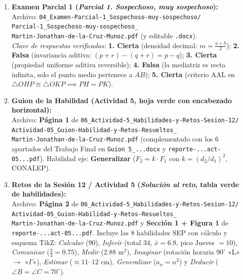 \documentclass[spanish,letterpaper,oneside]{article}
\begin{document}
\begin{enumerate}[leftmargin=1.5em,itemsep=4pt]
  \item \textbf{Examen Parcial 1 (\textit{Parcial 1. Sospechoso, muy sospechoso}):}\\
  Archivo: \texttt{04\_Examen-Parcial-1\_Sospechoso-muy-sospechoso/}\\
  \hspace*{1.2em}\texttt{Parcial-1\_Sospechoso-muy-sospechoso\_}\\
  \hspace*{1.2em}\texttt{Martin-Jonathan-de-la-Cruz-Munoz.pdf} (y editable \texttt{.docx}).\\
  \textit{Clave de respuestas verificadas:} \textbf{1. Cierta} (densidad decimal: $m=\frac{a+b}{2}$); \textbf{2. Falsa} (invariancia aditiva: $(p+r)-(q+r)=p-q$); \textbf{3. Cierta} (propiedad uniforme aditiva reversible); \textbf{4. Falsa} (la mediatriz es recta infinita, solo el punto medio pertenece a $\overline{AB}$); \textbf{5. Cierta} (criterio AAL en $\triangle OHP \cong \triangle OKP \implies PH=PK$).

  \item \textbf{Guion de la Habilidad (Actividad 5, hoja verde con encabezado horizontal):}\\
  Archivo: \textbf{Página 1} de \texttt{06\_Actividad-5\_Habilidades-y-Retos-Sesion-12/}\\
  \hspace*{1.2em}\texttt{Actividad-05\_Guion-Habilidad-y-Retos-Resueltos\_}\\
  \hspace*{1.2em}\texttt{Martin-Jonathan-de-la-Cruz-Munoz.pdf} (complementado con los 6 apartados del Trabajo Final en \texttt{Guion 5\_...docx} y \texttt{reporte-...act-05...pdf}). Habilidad eje: \textbf{Generalizar} ($F_2=k\cdot F_1$ con $k=(d_2/d_1)^2$, CONALEP).

  \item \textbf{Retos de la Sesión 12 / Actividad 5 (\textit{Solución al reto}, tabla verde de habilidades):}\\
  Archivo: \textbf{Página 2} de \texttt{06\_Actividad-5\_Habilidades-y-Retos-Sesion-12/}\\
  \hspace*{1.2em}\texttt{Actividad-05\_Guion-Habilidad-y-Retos-Resueltos\_}\\
  \hspace*{1.2em}\texttt{Martin-Jonathan-de-la-Cruz-Munoz.pdf} y \textbf{Sección 1 + Figura 1} de \texttt{reporte-...act-05...pdf}. Incluye las 8 habilidades SEP con cálculo y esquema TikZ: \textit{Calcular} ($90$), \textit{Inferir} (total $34$, $\bar{x}=6.8$, pico Jueves $=10$), \textit{Comunicar} ($\frac{3}{4}=0.75$), \textit{Medir} ($2.88\text{ m}^2$), \textit{Imaginar} (rotación horaria $90^\circ$ «L» $\to$ «$\Gamma$»), \textit{Estimar} ($\approx 11\text{--}12\text{ cm}$), \textit{Generalizar} ($a_n=n^2$) y \textit{Deducir} ($\angle B=\angle C=70^\circ$).


\end{enumerate}
\end{document}

